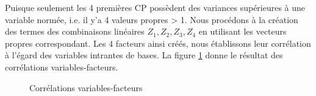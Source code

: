 	Puisque seulement les 4 premières CP possèdent des variances supérieures à une variable normée, i.e. il y'a 4 valeurs propres > 1. Nous procédons à la création des termes des combinaisons linéaires $Z_1,Z_2,Z_3,Z_4$ en utilisant les vecteurs propres correspondant.
	Les 4 facteurs ainsi créés, nous établissons leur corrélation à l'égard des variables intrantes de bases. La figure \ref{fig:ZZ} donne le résultat des corrélations variables-facteurs.
					\begin{figure}[H]
						    		\centering
						    		\caption{Corrélations variables-facteurs}
						    		\label{fig:ZZ}
					\end{figure}	
